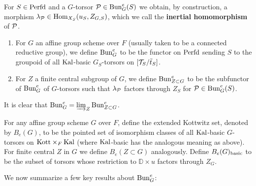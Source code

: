 For $S \in \mathrm{Perfd}$ and a $G$-torsor $\mathcal{P} \in \mathrm{Bun}_{G}^{e}(S)$ we obtain, by construction, a morphism $\lambda_{\mathcal{P}} \in \mathrm{Hom}_{X_{S}}(u_{S}, Z_{G,S})$, which we call the \textbf{inertial homomorphism} of $\mathcal{P}$. 

\begin{defi}\label{defi:BunGe}
\begin{enumerate}
   \item{For $G$ an affine group scheme over $F$ (usually taken to be a connected reductive group), we define $\mathrm{Bun}_{G}^{e}$ to be the functor on $\mathrm{Perfd}$ sending $S$ to the groupoid of all $\mathrm{Kal}$-basic $G_{S}$-torsors on $[\mathcal{T}_{S}/\tilde{t}_{S}]$.}

\item{For $Z$ a finite central subgroup of $G$, we define $\mathrm{Bun}_{Z \subset G}^{e}$ to be the subfunctor of $\mathrm{Bun}_{G}^{e}$ of $G$-torsors such that $\lambda_{\mathcal{P}}$ factors through $Z_{S}$ for $\mathcal{P} \in \mathrm{Bun}_{G}^{e}(S)$.}
   \end{enumerate}
\end{defi}

\begin{rque}
   It is clear that $\mathrm{Bun}_{G}^{e} = \varinjlim_{Z} \mathrm{Bun}_{Z \subset G}^{e}$. 
\end{rque}

\begin{defi}\label{defi:BeGdef}
    For any affine group scheme $G$ over $F$, define the extended Kottwitz set, denoted by $B_{e}(G)$, to be the pointed set of isomorphism classes of all $\mathrm{Kal}$-basic $G$-torsors on $\mathrm{Kott} \times_{F} \mathrm{Kal}$ (where $\mathrm{Kal}$-basic has the analogous meaning as above). For finite central $Z$ in $G$ we define $B_{e}(Z \subset G)$ analogously. Define $B_{e}(G)_{\textnormal{basic}}$ to be the subset of torsors whose restriction to $\mathbb{D} \times u$ factors through $Z_{G}$.
\end{defi}

We now summarize a few key results about $\mathrm{Bun}_{G}^{e}$:

